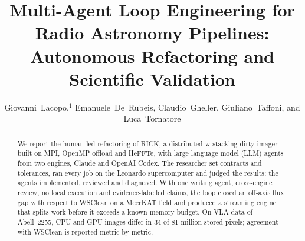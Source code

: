 \documentclass[11pt,twoside]{article}
\begin{document}
\title{Multi-Agent Loop Engineering for Radio Astronomy Pipelines: Autonomous Refactoring and Scientific Validation}

\author{Giovanni~Lacopo,$^1$ Emanuele~De~Rubeis, Claudio~Gheller, Giuliano~Taffoni, and Luca~Tornatore}




\begin{abstract}
We report the human-led refactoring of RICK, a distributed w-stacking dirty
imager built on MPI, OpenMP offload and HeFFTe, with large language model
(LLM) agents from two engines, Claude and OpenAI Codex. The researcher set
contracts and tolerances, ran every job on the Leonardo supercomputer and
judged the results; the agents implemented, reviewed and diagnosed. With one
writing agent, cross-engine review, no local execution and evidence-labelled
claims, the loop closed an
off-axis flux gap with respect to WSClean on a MeerKAT field and produced a
streaming engine that splits work before it exceeds a known memory budget. On
VLA data of Abell~2255, CPU and GPU images differ in 34 of 81 million stored
pixels; agreement with WSClean is reported metric by metric.
\end{abstract}

\end{document}
